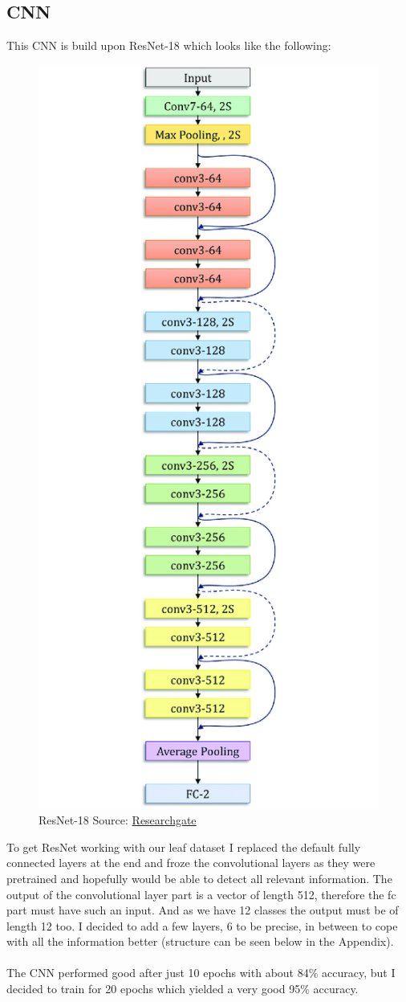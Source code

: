 \documentclass[UTF-8]{article}
\begin{document}
\subsection{CNN}
This CNN is build upon ResNet-18 which looks like the following:
\begin{figure}[H]
	\centering
	\includegraphics[width=0.25\linewidth]{_images/resnetArch}
	\caption{ResNet-18 Source:  \href{https://www.researchgate.net/figure/Architecture-of-the-ResNet-18-model-used-in-this-study_fig3_354432343}{Researchgate}}
	\label{fig:resnetarch}
\end{figure}

To get ResNet working with our leaf dataset I replaced the default fully connected layers at the end and froze the convolutional layers as they were pretrained and hopefully would be able to detect all relevant information.
The output of the convolutional layer part is a vector of length 512, therefore the fc part must have such an input. And as we have 12 classes the output must be of length 12 too. I decided to add a few layers, 6 to be precise, in between to cope with all the information better (structure can be seen below in the Appendix).\\\\
The CNN performed good after just 10 epochs with about 84\% accuracy, but I decided to train for 20 epochs which yielded a very good 95\% accuracy. 
\end{document}
